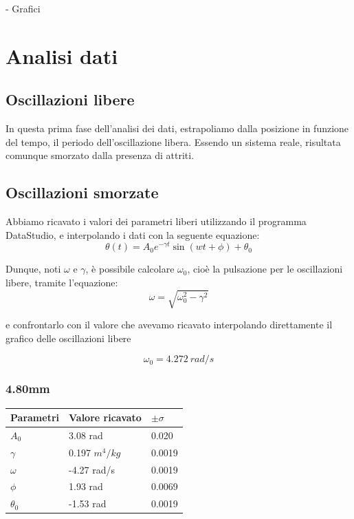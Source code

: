 \documentclass[a4paper,10pt]{report}
\begin{document}
- Grafici

\section{Analisi dati}

\subsection{Oscillazioni libere}
In questa prima fase dell'analisi dei dati, estrapoliamo dalla posizione in funzione del tempo, il periodo dell'oscillazione libera. Essendo un sistema reale, risultata comunque smorzato dalla presenza di attriti. 


\subsection{Oscillazioni smorzate}

Abbiamo ricavato i valori dei parametri liberi utilizzando il programma DataStudio, e interpolando i dati con la seguente equazione:
$$ \theta (t) = A_0 e^{- \gamma t} \sin(wt+\phi)+\theta_0 $$


Dunque, noti $\omega$ e $\gamma$, è possibile calcolare $ \omega_0 $, cioè la pulsazione per le oscillazioni libere, tramite l'equazione:
$$ \omega = \sqrt{\omega_0^2 - \gamma^2} $$

e confrontarlo con il valore che avevamo ricavato interpolando direttamente il grafico delle oscillazioni libere

$$\omega_0 = 4.272\ rad/s$$

\subsubsection{4.80mm}

\begin{center}
\begin{tabular}{l|l|l}
\midrule
Parametri & Valore ricavato & $ \pm \sigma$ \\
\midrule
$A_0$ & 3.08 rad & 0.020\\
$\gamma$ & 0.197 $m^4/kg$& 0.0019\\
$\omega$ & -4.27 rad/s& 0.0019\\
$\phi$ & 1.93 rad & 0.0069 \\
$\theta_0$ & -1.53 rad& 0.0019 \\
\midrule
\end{tabular}
\end{center}
\end{document}
